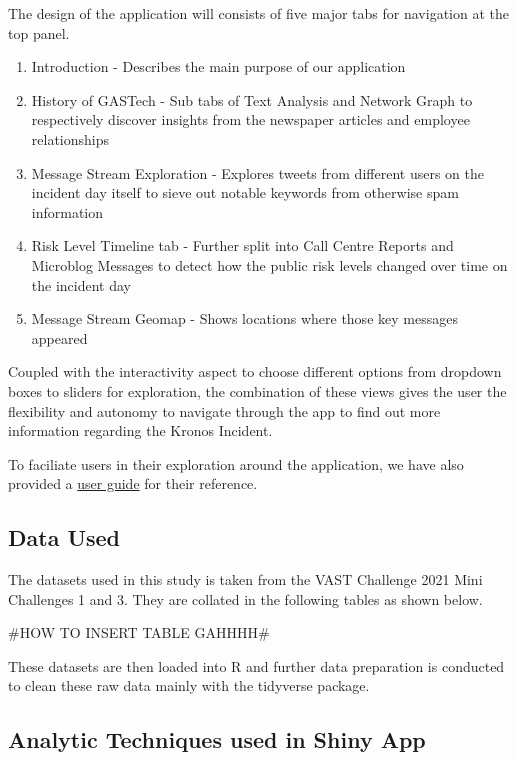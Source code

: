 \documentclass{acm_proc_article-sp}
\providecommand{\tightlist}{%
  \setlength{\itemsep}{0pt}\setlength{\parskip}{0pt}}
\begin{document}
The design of the application will consists of five major tabs for
navigation at the top panel.

\begin{enumerate}
\def\labelenumi{\roman{enumi})}
\tightlist
\item
  Introduction - Describes the main purpose of our application
\item
  History of GASTech - Sub tabs of Text Analysis and Network Graph to
  respectively discover insights from the newspaper articles and
  employee relationships
\item
  Message Stream Exploration - Explores tweets from different users on
  the incident day itself to sieve out notable keywords from otherwise
  spam information
\item
  Risk Level Timeline tab - Further split into Call Centre Reports and
  Microblog Messages to detect how the public risk levels changed over
  time on the incident day
\item
  Message Stream Geomap - Shows locations where those key messages
  appeared
\end{enumerate}

Coupled with the interactivity aspect to choose different options from
dropdown boxes to sliders for exploration, the combination of these
views gives the user the flexibility and autonomy to navigate through
the app to find out more information regarding the Kronos Incident.

To faciliate users in their exploration around the application, we have
also provided a
\href{https://grp15-vast-project.netlify.app/userguide}{user guide} for
their reference.

\hypertarget{data-used}{%
\subsection{Data Used}\label{data-used}}

The datasets used in this study is taken from the VAST Challenge 2021
Mini Challenges 1 and 3. They are collated in the following tables as
shown below.

\#HOW TO INSERT TABLE GAHHHH\#

These datasets are then loaded into R and further data preparation is
conducted to clean these raw data mainly with the tidyverse package.

\hypertarget{analytic-techniques-used-in-shiny-app}{%
\subsection{Analytic Techniques used in Shiny
App}\label{analytic-techniques-used-in-shiny-app}}
\end{document}
